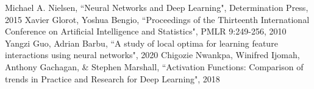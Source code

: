 \documentclass{article}
\begin{document}
\begin{thebibliography}{10}
 Michael A. Nielsen, ``Neural Networks and Deep Learning", Determination Press, 2015
Xavier Glorot, Yoshua Bengio, ``Proceedings of the Thirteenth International Conference on Artificial Intelligence and Statistics", PMLR 9:249-256, 2010
  Yangzi Guo, Adrian Barbu, ``A study of local optima for learning feature interactions using neural networks", 2020
 Chigozie Nwankpa, Winifred Ijomah, Anthony Gachagan, & Stephen Marshall, ``Activation Functions: Comparison of trends in Practice and Research for Deep Learning", 2018

\end{thebibliography}
\end{document}
